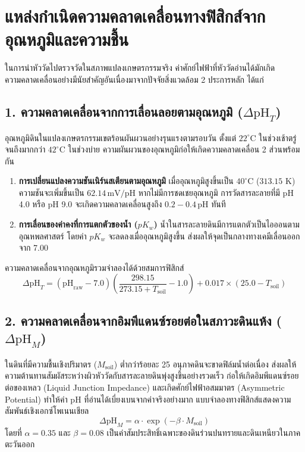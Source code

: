 \section{แหล่งกำเนิดความคลาดเคลื่อนทางฟิสิกส์จากอุณหภูมิและความชื้น}

ในการนำหัววัดไปตรวจวัดในสภาพแปลงเกษตรกรรมจริง ค่าศักย์ไฟฟ้าที่หัววัดอ่านได้มักเกิดความคลาดเคลื่อนอย่างมีนัยสำคัญอันเนื่องมาจากปัจจัยสิ่งแวดล้อม 2 ประการหลัก ได้แก่

\subsection{1. ความคลาดเคลื่อนจากการเลื่อนลอยตามอุณหภูมิ ($\Delta \text{pH}_T$)}
อุณหภูมิดินในแปลงเกษตรกรรมเขตร้อนผันผวนอย่างรุนแรงตามรอบวัน ตั้งแต่ $22^\circ\text{C}$ ในช่วงเช้าตรู่ จนถึงมากกว่า $42^\circ\text{C}$ ในช่วงบ่าย ความผันผวนของอุณหภูมิก่อให้เกิดความคลาดเคลื่อน 2 ส่วนพร้อมกัน
\begin{enumerate}
    \item \textbf{การเปลี่ยนแปลงความชันเนิร์นสเตียนตามอุณหภูมิ} เมื่ออุณหภูมิสูงขึ้นเป็น $40^\circ\text{C}$ ($313.15\text{ K}$) ความชันจะเพิ่มขึ้นเป็น $62.14 \, \text{mV/pH}$ หากไม่มีการชดเชยอุณหภูมิ การวัดสารละลายที่มี pH 4.0 หรือ pH 9.0 จะเกิดความคลาดเคลื่อนสูงถึง $0.2 - 0.4 \, \text{pH}$ ทันที
    \item \textbf{การเลื่อนของค่าคงที่การแตกตัวของน้ำ ($pK_w$)} น้ำในสารละลายดินมีการแตกตัวเป็นไอออนตามอุณหพลศาสตร์ โดยค่า $pK_w$ จะลดลงเมื่ออุณหภูมิสูงขึ้น ส่งผลให้จุดเป็นกลางทางเคมีเลื่อนออกจาก 7.00
\end{enumerate}

ความคลาดเคลื่อนจากอุณหภูมิรวมจำลองได้ด้วยสมการฟิสิกส์
\begin{equation}
\Delta \text{pH}_T = (\text{pH}_{\text{raw}} - 7.0)\left(\frac{298.15}{273.15 + T_{\text{soil}}} - 1.0\right) + 0.017 \times (25.0 - T_{\text{soil}})
\end{equation}

\subsection{2. ความคลาดเคลื่อนจากอิมพีแดนซ์รอยต่อในสภาวะดินแห้ง ($\Delta \text{pH}_M$)}
ในดินที่มีความชื้นเชิงปริมาตร ($M_{\text{soil}}$) ต่ำกว่าร้อยละ 25 อนุภาคดินจะขาดฟิล์มน้ำต่อเนื่อง ส่งผลให้ความต้านทานสัมผัสระหว่างผิวหัววัดกับสารละลายดินพุ่งสูงขึ้นอย่างรวดเร็ว ก่อให้เกิดอิมพีแดนซ์รอยต่อของเหลว (Liquid Junction Impedance) และเกิดศักย์ไฟฟ้าอสมมาตร (Asymmetric Potential) ทำให้ค่า pH ที่อ่านได้เบี่ยงเบนจากค่าจริงอย่างมาก แบบจำลองทางฟิสิกส์แสดงความสัมพันธ์เชิงเอกซ์โพเนนเชียล
\begin{equation}
\Delta \text{pH}_M = \alpha \cdot \exp(-\beta \cdot M_{\text{soil}})
\end{equation}
โดยที่ $\alpha = 0.35$ และ $\beta = 0.08$ เป็นค่าสัมประสิทธิ์เฉพาะของดินร่วนปนทรายและดินเหนียวในภาคตะวันออก

